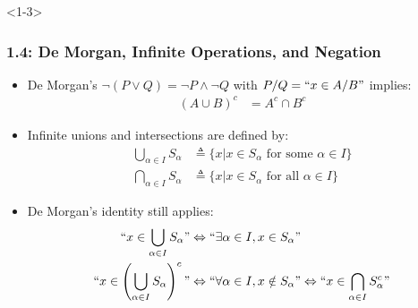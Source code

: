\documentclass[10pt,english,aspectratio=169]{beamer}
\begin{document}
\begin{frame}<1-3> \frametitle{1.4: De Morgan, Infinite Operations, and Negation}

\begin{itemize}
\setlength\itemsep{3mm}
\item<1-> De Morgan's $\neg (P \vee Q) = \neg P \wedge \neg Q$ with $P/Q=``x\in A/B"$ implies: $\!\!\!\!\!\!\!\!\!\!\!\!$
\begin{align*}
(A \cup B)^c & = A^c \cap B^c
\end{align*}

\item<2-> Infinite unions and intersections are defined by:
  \begin{align*}
  \bigcup_{\alpha \in I} S_{\alpha}
  &\triangleq \{ x | x \in S_{\alpha} \text{ for some } \alpha \in I \} \\
  \bigcap_{\alpha \in I} S_{\alpha}
  &\triangleq \{ x | x \in S_{\alpha} \text{ for all } \alpha \in I \} 
  \end{align*}  
  
\item<3-> De Morgan's identity still applies:
  \begin{align*}
  ``x \in \bigcup_{\alpha \in I} S_{\alpha}" &\Leftrightarrow ``\exists \alpha \in I, x\in S_\alpha" \\
  ``x \in \left(\bigcup_{\alpha \in I} S_{\alpha}\right)^c" &\Leftrightarrow ``\forall \alpha \in I, x \notin S_\alpha" \Leftrightarrow ``x \in \bigcap_{\alpha \in I} S^c_{\alpha}"
  \end{align*}  
  
\end{itemize}


\end{frame}
\end{document}
